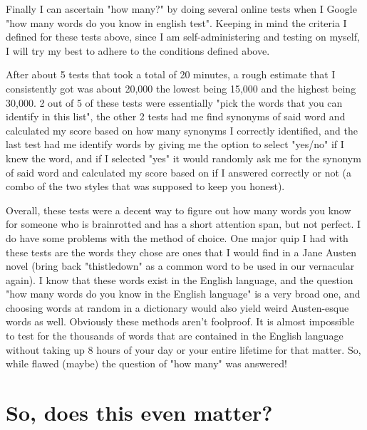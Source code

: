 \documentclass[11pt]{article}
\begin{document}
Finally I can ascertain "how many?" by doing several online tests when I Google "how many words do you know in english test". Keeping in mind the criteria I defined for these tests above, since I am self-administering and testing on myself, I will try my best to adhere to the conditions defined above.

After about 5 tests that took a total of 20 minutes, a rough estimate that I consistently got was about 20,000 the lowest being 15,000 and the highest being 30,000. 2 out of 5 of these tests were essentially "pick the words that you can identify in this list", the other 2 tests had me find synonyms of said word and calculated my score based on how many synonyms I correctly identified, and the last test had me identify words by giving me the option to select "yes/no" if I knew the word, and if I selected "yes" it would randomly ask me for the synonym of said word and calculated my score based on if I answered correctly or not (a combo of the two styles that was supposed to keep you honest).

Overall, these tests were a decent way to figure out how many words you know for someone who is brainrotted and has a short attention span, but not perfect. I do have some problems with the method of choice. One major quip I had with these tests are the words they chose are ones that I would find in a Jane Austen novel (bring back "thistledown" as a common word to be used in our vernacular again). I know that these words exist in the English language, and the question "how many words do you know in the English language" is a very broad one, and choosing words at random in a dictionary would also yield weird Austen-esque words as well. Obviously these methods aren't foolproof. It is almost impossible to test for the thousands of words that are contained in the English language without taking up 8 hours of your day or your entire lifetime for that matter. So, while flawed (maybe) the question of "how many" was answered!

\section{So, does this even matter?}
\end{document}
